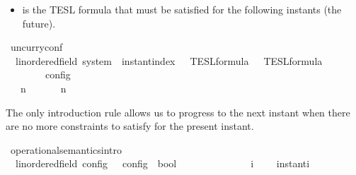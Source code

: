 \begin{isabellebody}
\begin{isamarkuptext}
\begin{itemize}
\item \isa{{\isasymPhi}} is the TESL formula that must be satisfied for the following instants (the future).%
\end{itemize}%
\end{isamarkuptext}\isamarkuptrue%
\isamarkupfalse%
\ uncurry{\isacharunderscore}conf\isanewline
\ \ {\isacharcolon}{\isacharcolon}{\isacartoucheopen}{\isacharparenleft}{\isacharprime}{\isasymtau}{\isacharcolon}{\isacharcolon}linordered{\isacharunderscore}field{\isacharparenright}\ system\ {\isasymRightarrow}\ instant{\isacharunderscore}index\ {\isasymRightarrow}\ {\isacharprime}{\isasymtau}\ TESL{\isacharunderscore}formula\ {\isasymRightarrow}\ {\isacharprime}{\isasymtau}\ TESL{\isacharunderscore}formula\isanewline
\ \ \ \ \ \ {\isasymRightarrow}\ {\isacharprime}{\isasymtau}\ config{\isacartoucheclose}\ \ \ \ \ \ \ \ \ \ \ \ \ \ \ \ \ \ \ \ \ \ \ \ \ \ \ \ \ \ \ \ \ \ \ \ \ \ \ \ \ \ \ \ \ \ \ \ \ \ {\isacharparenleft}{\isachardoublequoteopen}{\isacharunderscore}{\isacharcomma}\ {\isacharunderscore}\ {\isasymturnstile}\ {\isacharunderscore}\ {\isasymtriangleright}\ {\isacharunderscore}{\isachardoublequoteclose}\ {}{}{\isacharparenright}\isanewline
{}\isanewline
\ \ {\isacartoucheopen}{\isasymGamma}{\isacharcomma}\ n\ {\isasymturnstile}\ {\isasymPsi}\ {\isasymtriangleright}\ {\isasymPhi}\ {\isasymequiv}\ {\isacharparenleft}{\isasymGamma}{\isacharcomma}\ n{\isacharcomma}\ {\isasymPsi}{\isacharcomma}\ {\isasymPhi}{\isacharparenright}{\isacartoucheclose}%
\begin{isamarkuptext}%
The only introduction rule allows us to progress to the next instant 
  when there are no more constraints to satisfy for the present instant.%
\end{isamarkuptext}\isamarkuptrue%
\isamarkupfalse%
\ operational{\isacharunderscore}semantics{\isacharunderscore}intro\isanewline
\ \ {\isacharcolon}{\isacharcolon}{\isacartoucheopen}{\isacharparenleft}{\isacharprime}{\isasymtau}{\isacharcolon}{\isacharcolon}linordered{\isacharunderscore}field{\isacharparenright}\ config\ {\isasymRightarrow}\ {\isacharprime}{\isasymtau}\ config\ {\isasymRightarrow}\ bool{\isacartoucheclose}\ \ \ \ \ \ \ \ \ \ \ \ \ \ {\isacharparenleft}{\isachardoublequoteopen}{\isacharunderscore}\ {\isasymhookrightarrow}\isactrlsub i\ {\isacharunderscore}{\isachardoublequoteclose}\ {}{}{\isacharparenright}\isanewline
{}\isanewline
\ \ instant{\isacharunderscore}i{\isacharcolon}\isanewline

\end{isabellebody}
